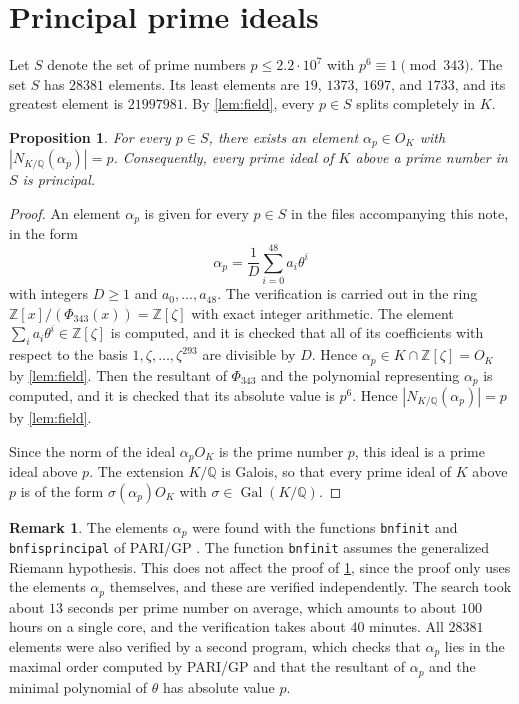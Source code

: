 \documentclass[11pt]{amsart}
\theoremstyle{plain}
\newtheorem{proposition}[theorem]{Proposition}
\theoremstyle{definition}
\newtheorem{remark}[theorem]{Remark}
\begin{document}
\section{Principal prime ideals} \label{sec:cert}

Let $S$ denote the set of prime numbers $p \le 2.2 \cdot 10^7$ with $p^6 \equiv 1 \pmod{343}$.
The set $S$ has $28381$ elements.
Its least elements are $19$, $1373$, $1697$, and $1733$, and its greatest element is $21997981$.
By \cref{lem:field}, every $p \in S$ splits completely in $K$.

\begin{proposition} \label{prop:cert}
For every $p \in S$, there exists an element $\alpha_p \in O_K$ with $|N_{K/\mathbb{Q}}(\alpha_p)| = p$.
Consequently, every prime ideal of $K$ above a prime number in $S$ is principal.
\end{proposition}

\begin{proof}
An element $\alpha_p$ is given for every $p \in S$ in the files accompanying this note, in the form
\[
\alpha_p = \frac{1}{D} \sum_{i=0}^{48} a_i \theta^i
\]
with integers $D \ge 1$ and $a_0, \ldots, a_{48}$.
The verification is carried out in the ring $\mathbb{Z}[x]/(\Phi_{343}(x)) = \mathbb{Z}[\zeta]$ with exact integer arithmetic.
The element $\sum_i a_i \theta^i \in \mathbb{Z}[\zeta]$ is computed, and it is checked that all of its coefficients with respect to the basis $1, \zeta, \ldots, \zeta^{293}$ are divisible by $D$.
Hence $\alpha_p \in K \cap \mathbb{Z}[\zeta] = O_K$ by \cref{lem:field}.
Then the resultant of $\Phi_{343}$ and the polynomial representing $\alpha_p$ is computed, and it is checked that its absolute value is $p^6$.
Hence $|N_{K/\mathbb{Q}}(\alpha_p)| = p$ by \cref{lem:field}.

Since the norm of the ideal $\alpha_p O_K$ is the prime number $p$, this ideal is a prime ideal above $p$.
The extension $K/\mathbb{Q}$ is Galois, so that every prime ideal of $K$ above $p$ is of the form $\sigma(\alpha_p) O_K$ with $\sigma \in \operatorname{Gal}(K/\mathbb{Q})$.
\end{proof}

\begin{remark} \label{rem:search}
The elements $\alpha_p$ were found with the functions \texttt{bnfinit} and \texttt{bnfisprincipal} of PARI/GP \cite{PARI}.
The function \texttt{bnfinit} assumes the generalized Riemann hypothesis.
This does not affect the proof of \cref{prop:cert}, since the proof only uses the elements $\alpha_p$ themselves, and these are verified independently.
The search took about $13$ seconds per prime number on average, which amounts to about $100$ hours on a single core, and the verification takes about $40$ minutes.
All $28381$ elements were also verified by a second program, which checks that $\alpha_p$ lies in the maximal order computed by PARI/GP and that the resultant of $\alpha_p$ and the minimal polynomial of $\theta$ has absolute value $p$.
\end{remark}
\end{document}

